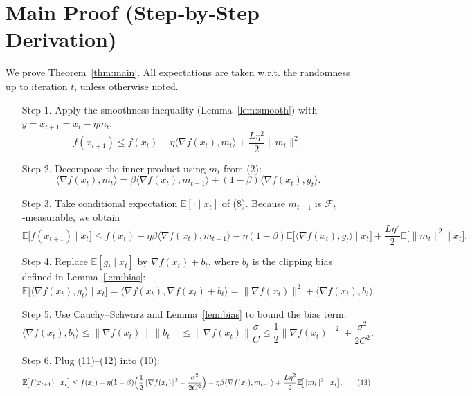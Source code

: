 \documentclass{article}
\newcommand{\EE}{\mathbb{E}}
\begin{document}
\section*{Main Proof (Step‑by‑Step Derivation)}
We prove Theorem~\ref{thm:main}.  
All expectations are taken w.r.t. the randomness up to iteration $t$,
unless otherwise noted.

\begin{enumerate}
\item[Step 1.] Apply the smoothness inequality (Lemma~\ref{lem:smooth}) with
$y=x_{t+1}=x_t-\eta m_t$:
\[
f(x_{t+1})\le f(x_t)-\eta\langle\nabla f(x_t),m_t\rangle
          +\frac{L\eta^{2}}{2}\|m_t\|^{2}.
\tag{8}
\]

\item[Step 2.] Decompose the inner product using $m_t$ from (2):
\[
\langle\nabla f(x_t),m_t\rangle
 =\beta\langle\nabla f(x_t),m_{t-1}\rangle
   +(1-\beta)\langle\nabla f(x_t),g_t\rangle .
\tag{9}
\]

\item[Step 3.] Take conditional expectation $\EE[\cdot\mid x_t]$ of (8).
Because $m_{t-1}$ is $\mathcal{F}_t$‑measurable, we obtain
\[
\EE\!\big[f(x_{t+1})\mid x_t\big]
 \le f(x_t)-\eta\beta\langle\nabla f(x_t),m_{t-1}\rangle
      -\eta(1-\beta)\EE\!\big[\langle\nabla f(x_t),g_t\rangle\mid x_t\big]
      +\frac{L\eta^{2}}{2}\EE\!\big[\|m_t\|^{2}\mid x_t\big].
\tag{10}
\]

\item[Step 4.] Replace $\EE[g_t\mid x_t]$ by $\nabla f(x_t)+b_t$,
where $b_t$ is the clipping bias defined in Lemma~\ref{lem:bias}:
\[
\EE\!\big[\langle\nabla f(x_t),g_t\rangle\mid x_t\big]
   =\langle\nabla f(x_t),\nabla f(x_t)+b_t\rangle
   =\|\nabla f(x_t)\|^{2}+\langle\nabla f(x_t),b_t\rangle.
\tag{11}
\]

\item[Step 5.] Use Cauchy–Schwarz and Lemma~\ref{lem:bias} to bound the
bias term:
\[
\langle\nabla f(x_t),b_t\rangle
   \le\|\nabla f(x_t)\|\,\|b_t\|
   \le\|\nabla f(x_t)\|\frac{\sigma}{C}
   \le\frac{1}{2}\|\nabla f(x_t)\|^{2}
        +\frac{\sigma^{2}}{2C^{2}} .
\tag{12}
\]

\item[Step 6.] Plug (11)–(12) into (10):
\[
\EE\!\big[f(x_{t+1})\mid x_t\big]
 \le f(x_t)-\eta(1-\beta)\Bigl(\frac12\|\nabla f(x_t)\|^{2}
                               -\frac{\sigma^{2}}{2C^{2}}\Bigr)
      -\eta\beta\langle\nabla f(x_t),m_{t-1}\rangle
      +\frac{L\eta^{2}}{2}\EE\!\big[\|m_t\|^{2}\mid x_t\big].
\tag{13}
\]


\end{enumerate}
\end{document}

